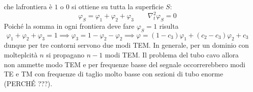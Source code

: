 \documentclass{book}
\begin{document}
        che lafrontiera è $1$ o $0$ si ottiene su tutta la superficie $S$:
        \begin{equation}
            \varphi_{S} = \varphi_{1}+\varphi_{2}+\varphi_{3} \qquad \nabla_{t} ^{2} \varphi_{S} = 0
        \end{equation} 
        Poiché la somma in ogni frontiera deve fare $\varphi_{S} = 1$ risulta
        \begin{equation}
            \varphi_{1}+\varphi_{2}+\varphi_{3} = 1 \implies \varphi_{3} = 1- \varphi_{2} - \varphi_{2} \implies \varphi = (1-c_{3})\varphi_{1}+(c_{2}-c_{3})\varphi_{2}+c_{3}
        \end{equation}
        dunque per tre contorni servono due modi TEM. In generale, per un dominio con molteplcità $n$ si propagano $n-1$ modi TEM. Il problema del tubo cavo allora non ammette modo TEM e per frequenze 
        basse del segnale occorrerebbero modi TE e TM con frequenze di taglio molto basse con sezioni di tubo enorme (PERCHÉ ???). \newpage
\end{document}
